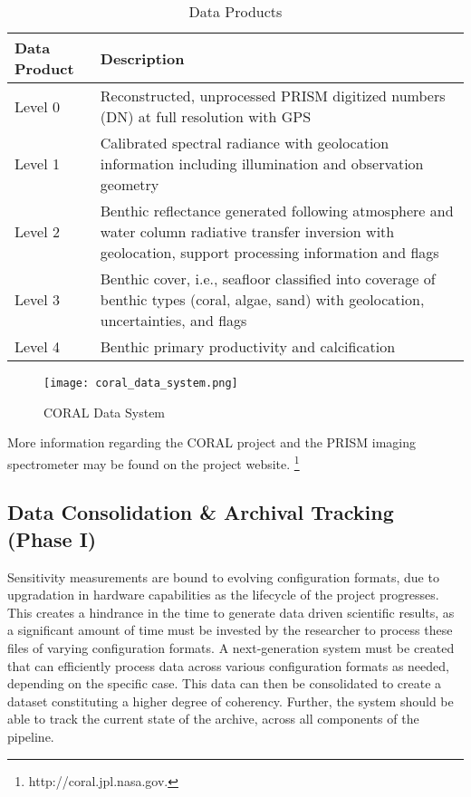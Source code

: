 \documentclass{article}
\begin{document}
\begin{multicols*}{2}
\begin{table}[H]
	\caption{Data Products}
	\begin{tabular}{| >{\centering\arraybackslash}m{1in} | >{\centering\arraybackslash}m{2in} |}
		\hline
		Data Product & Description \\
		\hline 
		Level 0 & Reconstructed, unprocessed PRISM digitized numbers (DN) at full resolution with GPS \\
		\hline 
		Level 1 & Calibrated spectral radiance with geolocation information including illumination and observation geometry \\
		\hline 
		Level 2 & Benthic reflectance generated following atmosphere and water column radiative transfer inversion with geolocation, support processing information and flags \\
		\hline 
		Level 3 & Benthic cover, i.e., seafloor classified into coverage of benthic types (coral, algae, sand) with geolocation, uncertainties, and flags \\
		\hline 
		Level 4 & Benthic primary productivity and calcification \\
		\hline 
	\end{tabular}
\end{table}

\begin{figure}[H]
\centering
\texttt{[image: coral\_data\_system.png]}
\caption{CORAL Data System}
\end{figure}

More information regarding the CORAL project and the PRISM imaging spectrometer may be found on the project website. \footnote{http://coral.jpl.nasa.gov.}

\subsection{Data Consolidation \& Archival Tracking (Phase I)}
Sensitivity measurements are bound to evolving configuration formats, due to upgradation in hardware capabilities as the lifecycle of the project progresses. This creates a hindrance in the time to generate data driven scientific results, as a significant amount of time must be invested by the researcher to process these files of varying configuration formats. A next-generation system must be created that can efficiently process data across various configuration formats as needed, depending on the specific case. This data can then be consolidated to create a dataset constituting a higher degree of coherency. Further, the system should be able to track the current state of the archive, across all components of the pipeline.

\end{multicols*}
\end{document}
